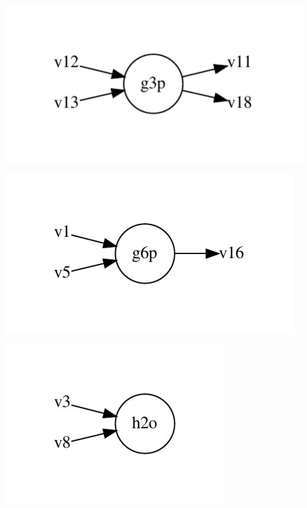 \documentclass{scrartcl}
\begin{document}
\begin{minipage}{0.33\linewidth}
\includegraphics[max width=\linewidth]{metabolic_maps/g3p.pdf}
\end{minipage}
\begin{minipage}{0.33\linewidth}
\includegraphics[max width=\linewidth]{metabolic_maps/g6p.pdf}
\end{minipage}
\begin{minipage}{0.33\linewidth}
\includegraphics[max width=\linewidth]{metabolic_maps/h2o.pdf}
\end{minipage}
\end{document}

